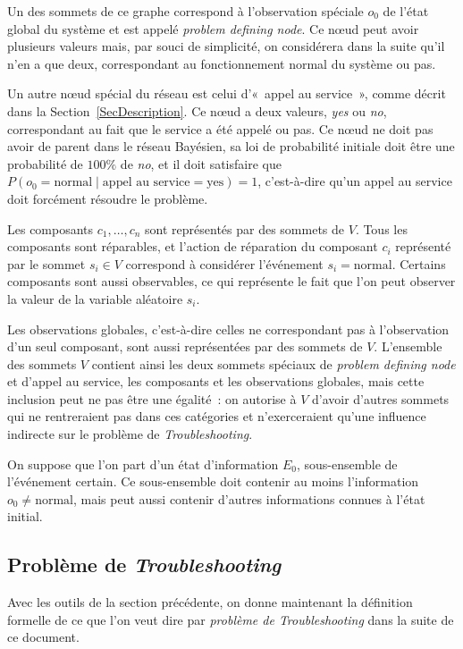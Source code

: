 \documentclass[a4paper,11pt]{article}
\theoremstyle{plain}
\theoremstyle{definition}
\begin{document}
Un des sommets de ce graphe correspond à l'observation spéciale $o_0$ de l'état global du système et est appelé \emph{problem defining node}. Ce nœud peut avoir plusieurs valeurs mais, par souci de simplicité, on considérera dans la suite qu'il n'en a que deux, correspondant au fonctionnement normal du système ou pas.

Un autre nœud spécial du réseau est celui d'«~appel au service~», comme décrit dans la Section~\ref{SecDescription}. Ce nœud a deux valeurs, \emph{yes} ou \emph{no}, correspondant au fait que le service a été appelé ou pas. Ce nœud ne doit pas avoir de parent dans le réseau Bayésien, sa loi de probabilité initiale doit être une probabilité de $100\%$ de \emph{no}, et il doit satisfaire que $P(o_0 = \text{normal} \mid \text{appel au service} = \text{yes}) = 1$, c'est-à-dire qu'un appel au service doit forcément résoudre le problème.

Les composants $c_1, \dotsc, c_n$ sont représentés par des sommets de $V$. Tous les composants sont réparables, et l'action de réparation du composant $c_i$ représenté par le sommet $s_i \in V$ correspond à considérer l'événement $s_i = \text{normal}$. Certains composants sont aussi observables, ce qui représente le fait que l'on peut observer la valeur de la variable aléatoire $s_i$.

Les observations globales, c'est-à-dire celles ne correspondant pas à l'observation d'un seul composant, sont aussi représentées par des sommets de $V$. L'ensemble des sommets $V$ contient ainsi les deux sommets spéciaux de \emph{problem defining node} et d'appel au service, les composants et les observations globales, mais cette inclusion peut ne pas être une égalité~: on autorise à $V$ d'avoir d'autres sommets qui ne rentreraient pas dans ces catégories et n'exerceraient qu'une influence indirecte sur le problème de \emph{Troubleshooting}.

On suppose que l'on part d'un état d'information $E_0$, sous-ensemble de l'événement certain. Ce sous-ensemble doit contenir au moins l'information $o_0 \neq \text{normal}$, mais peut aussi contenir d'autres informations connues à l'état initial.

\subsection{Problème de \emph{Troubleshooting}}
\label{SecProbTrouble}

Avec les outils de la section précédente, on donne maintenant la définition formelle de ce que l'on veut dire par \emph{problème de Troubleshooting} dans la suite de ce document.
\end{document}
